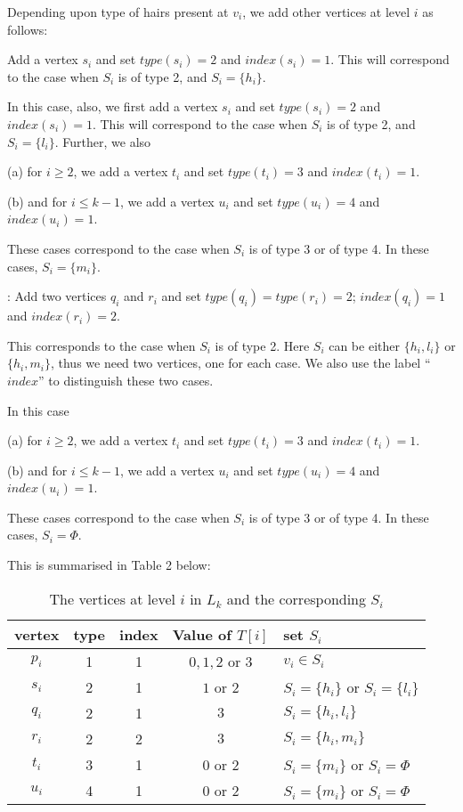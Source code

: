\documentclass[10pt]{article}
\begin{document}
Depending upon type of hairs present at $v_i$, we add other vertices at
level $i$ as follows: 


 Add a vertex $s_i$ and set
$type(s_i)=2$ and $index(s_i)=1$. This will correspond to the case when
$S_i$ is of type 2, and $S_i=\{h_i\}$.

 In this case, also, we
first add a vertex $s_i$ and set $type(s_i)=2$ and $index(s_i)=1$. This
will correspond to the case when $S_i$ is of type 2, and $S_i=\{l_i\}$.  
Further, we also 

\noindent (a) for $i\geq 2$, we add a vertex $t_i$ and set $type(t_i)=3$ and
$index(t_i)=1$.
  
\noindent (b) and for $i\leq k-1$, we add a vertex $u_i$ and set $type(u_i)=4$ and
$index(u_i)=1$.  

These cases correspond to the case when $S_i$ is of type 3 or of type 4.
In these cases, $S_i=\{m_i\}$. 


: Add two vertices
$q_{i}$ and $r_{i}$ and set $type(q_{i})=type(r_{i})=2$; $index(q_{i})=1$
and $index(r_{i})=2$.

This corresponds to the case when $S_i$ is of type 2. Here $S_i$ can be
either $\{h_i,l_i\}$ or $\{h_i,m_i\}$, thus we need two vertices, one for
each case. We also use the label ``$index$'' to distinguish these two
cases.

 In this case

\noindent (a) for $i\geq 2$, we add a vertex $t_i$ and set $type(t_i)=3$ and
$index(t_i)=1$.
  
\noindent (b) and for $i\leq k-1$, we add a vertex $u_i$ and set $type(u_i)=4$ and
$index(u_i)=1$.  

These cases correspond to the case when $S_i$ is of type 3 or of type 4.
In these cases, $S_i=\Phi$.
 

This is summarised in Table 2 below:
\begin{table}[h!]
\centering
\begin{tabular}{|c||c|c|c|l|}
  \hline
  vertex & type    &index  & Value of $T[i]$ & set $S_i$ \\
  \hline \hline	
  $p_i$  & 1	   & 1	   & $0,1,2$ or $3$ & $v_i\in S_i$ \\
  \hline
  $s_i$  & 2 	   & 1	   & $1$ or $2$ & $S_i=\{h_i\}$ or $S_i=\{l_i\}$ \\
  \hline
  $q_i$  & 2	   & 1	   & $3$ & $S_i=\{h_i,l_i\}$ \\
  \hline
  $r_i$  & 2	   & 2	   & $3$ & $S_i=\{h_i,m_i\}$ \\
  \hline
  $t_i$  & 3	   & 1	   & $0$ or $2$ & $S_i=\{m_i\}$ or $S_i=\Phi$ \\
  \hline
  $u_i$  & 4	   & 1	   & $0$ or $2$ & $S_i=\{m_i\}$ or $S_i=\Phi$ \\
  \hline
\end{tabular}
\caption{The vertices at level $i$ 
in $L_k$ and the corresponding $S_i$}
\label{tab:sec}
\end{table}
\end{document}
